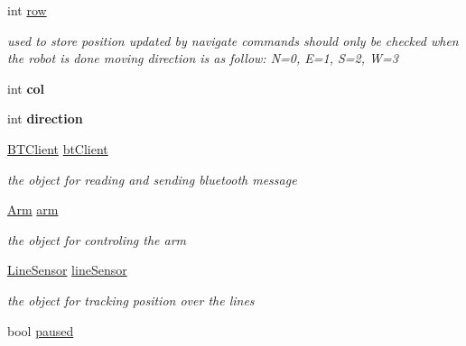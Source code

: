 \begin{DoxyCompactItemize}
\item 
\hypertarget{classRobot_a35ce5c416a079fcf6b943843ec151d63}{int \hyperlink{classRobot_a35ce5c416a079fcf6b943843ec151d63}{row}}\label{classRobot_a35ce5c416a079fcf6b943843ec151d63}

\begin{DoxyCompactList}\small\item\em used to store position updated by navigate commands should only be checked when the robot is done moving direction is as follow\-: N=0, E=1, S=2, W=3 \end{DoxyCompactList}\item 
\hypertarget{classRobot_a2e08d53491bb82defe2e28ee9ce1d096}{int {\bfseries col}}\label{classRobot_a2e08d53491bb82defe2e28ee9ce1d096}

\item 
\hypertarget{classRobot_ac25b4dfc2e9e5aa86ec5684d075d32b8}{int {\bfseries direction}}\label{classRobot_ac25b4dfc2e9e5aa86ec5684d075d32b8}

\item 
\hypertarget{classRobot_a9da91e6d551ed02038e935b3c755cc75}{\hyperlink{classBTClient}{B\-T\-Client} \hyperlink{classRobot_a9da91e6d551ed02038e935b3c755cc75}{bt\-Client}}\label{classRobot_a9da91e6d551ed02038e935b3c755cc75}

\begin{DoxyCompactList}\small\item\em the object for reading and sending bluetooth message \end{DoxyCompactList}\item 
\hypertarget{classRobot_a444673862cbe384992aceb066282b500}{\hyperlink{classArm}{Arm} \hyperlink{classRobot_a444673862cbe384992aceb066282b500}{arm}}\label{classRobot_a444673862cbe384992aceb066282b500}

\begin{DoxyCompactList}\small\item\em the object for controling the arm \end{DoxyCompactList}\item 
\hypertarget{classRobot_abdc300045bea9a31013b25682629752d}{\hyperlink{classLineSensor}{Line\-Sensor} \hyperlink{classRobot_abdc300045bea9a31013b25682629752d}{line\-Sensor}}\label{classRobot_abdc300045bea9a31013b25682629752d}

\begin{DoxyCompactList}\small\item\em the object for tracking position over the lines \end{DoxyCompactList}\item 
\hypertarget{classRobot_a6a1fae6e6ee0a3298b9e60d3f50ad12a}{bool \hyperlink{classRobot_a6a1fae6e6ee0a3298b9e60d3f50ad12a}{paused}}\label{classRobot_a6a1fae6e6ee0a3298b9e60d3f50ad12a}


\end{DoxyCompactItemize}
